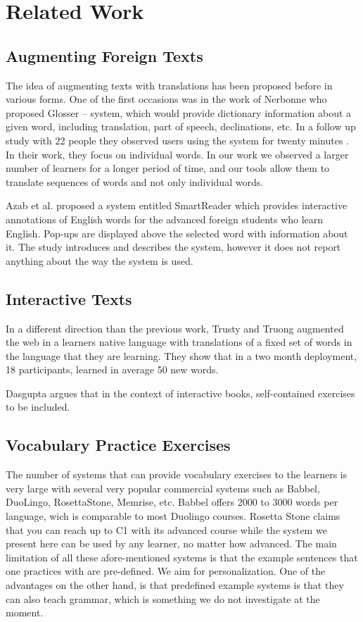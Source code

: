 
\newpage
\section{Related Work}


\subsection{Augmenting Foreign Texts}
The idea of augmenting texts with translations has been proposed before in various forms. One of the first occasions was in the work of Nerbonne \cite{Nerb99-Assistant} who proposed Glosser -- system, which would provide dictionary information about a given word, including translation, part of speech, declinations, etc. In a follow up study with 22 people they observed users using the system for twenty minutes \cite{Dokter98-UserStudy}. In their work, they focus on individual words. In our work we observed a larger number of learners for a longer period of time, and our tools allow them to translate sequences of words and not only individual words. 

Azab et al. \cite{Azab13-nlp} proposed a system entitled SmartReader which provides interactive annotations of English words for the advanced foreign students who learn English. Pop-ups are displayed above the selected word with information about it. The study introduces and describes the system, however it does not report anything about the way the system is used.

\subsection{Interactive Texts}
In a different direction than the previous work, Trusty and Truong augmented the web in a learners native language with translations of a fixed set of words in the language that they are learning\cite{Trus11web}. They show that in a two month deployment, 18 participants, learned in average 50 new words.

Dasgupta argues that in the context of interactive books, self-contained exercises to be included. \cite{Dasgupta10-Play}

\subsection{Vocabulary Practice Exercises}
The number of systems that can provide vocabulary exercises to the learners is very large with several very popular commercial systems such as Babbel, DuoLingo, RosettaStone, Memrise, etc. Babbel offers 2000 to 3000 words per language, wich is comparable to most Duolingo courses. Rosetta Stone claims that you can reach up to C1 with its advanced course while the system we present here can be used by any learner, no matter how advanced. The main limitation of all these afore-mentioned systems is that the example sentences that one practices with are pre-defined. We aim for personalization. One of the advantages on the other hand, is that predefined example systems is that they can also teach grammar, which is something we do not investigate at the moment.

